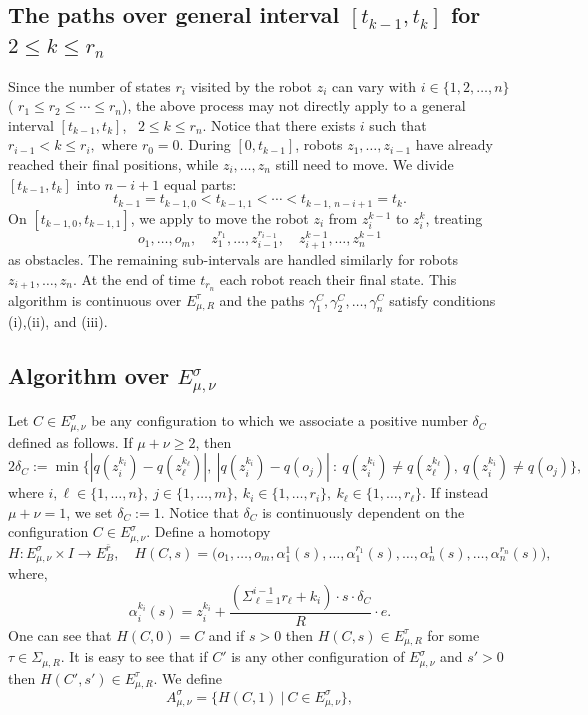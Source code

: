 \documentclass[12pt,oneside,reqno]{amsart}
\theoremstyle{plain}
\theoremstyle{definition}
\theoremstyle{remark}
\begin{document}
\medskip
\noindent
\subsection*{The paths over general interval \texorpdfstring{$[t_{k-1}, t_k]$ for $2 \leq k \leq r_n$}:}
Since the number of states $r_i$ visited by the robot $z_i$ can vary with $i \in \{1,2,\ldots,n\}$ ( $r_1 \leq r_2 \leq \cdots \leq r_n$), the above process may not directly apply to a general interval $[t_{k-1}, t_k]$,~ $2 \leq k \leq r_n$. Notice that there exists $i$ such that
$r_{i-1} < k \leq r_i, \text{ where } r_0 = 0.$
During $[0, t_{k-1}]$, robots $z_1, \ldots, z_{i-1}$ have already reached their final positions, while $z_i, \ldots, z_n$ still need to move.
We divide $[t_{k-1}, t_k]$ into $n - i + 1$ equal parts:
$$
t_{k-1} = t_{k-1,0} < t_{k-1,1} < \cdots < t_{k-1,\,n-i+1} = t_k.
$$
On $[t_{k-1,0}, t_{k-1,1}]$, we apply \cite[Section~2]{FarP23} to move the robot $z_i$ from $z_i^{k-1}$ to $z_i^k$, treating
\[
o_1, \ldots, o_m, \quad z_1^{r_1}, \ldots, z_{i-1}^{r_{i-1}}, \quad z_{i+1}^{k-1}, \ldots, z_n^{k-1}
\]
as obstacles. The remaining sub-intervals are handled similarly for robots $z_{i+1}, \ldots, z_n$.  At the end of time $t_{r_n}$ each robot reach their final state. 
This algorithm is continuous over $E_{\mu, R}^{\tau}$ and the paths $\gamma_1^C, \gamma_2^C, \ldots, \gamma_n^C$ satisfy conditions (i),(ii), and (iii).


\subsection{Algorithm over \texorpdfstring{$E_{\mu, \nu}^{\sigma}$}:} 

Let $C \in E_{\mu, \nu}^{\sigma}$ be any configuration to which we associate a positive number $\delta_C$ defined as follows. If $\mu + \nu \geq 2$, then  
$$2\delta_C:= \min \Big\{|q(z_i^{k_i})-q(z_\ell^{k_\ell})|, ~|q(z_i^{k_i})-q(o_j)|~\colon~q(z_i^{k_i})\neq q(z_\ell^{k_\ell}),~ q(z_i^{k_i})\neq q(o_j)\Big\},$$
where $i, \ell \in \{1, \ldots, n\}, ~ j\in \{1, \ldots, m\}, ~ k_i \in \{1, \ldots, r_i\}, ~ k_\ell \in \{1, \ldots, r_\ell\}$. If instead $\mu + \nu = 1$, we set $\delta_C := 1$. Notice that $\delta_C$ is continuously dependent on the configuration $C \in E_{\mu, \nu}^{\sigma}$.  Define a homotopy 
$$H:  E_{\mu, \nu}^{\sigma} \times I \to E^{\bar{r}}_B, \quad H(C, s)= \Big(o_1, \ldots, o_m, \alpha^1_{1}(s), \ldots , \alpha^{r_{1}}_{1}(s), \ldots, \alpha^1_{n}(s), \ldots , \alpha^{r_{n}}_{n}(s) \Big),$$
where, $$\alpha_i^{k_i}(s)= z_i^{k_i}+ \frac{(\Sigma_{\ell=1}^{i-1}r_\ell + k_i)\cdot s \cdot \delta_C}{R}\cdot e.$$   
One can see that $H(C, 0)=C$ and if $s>0$ then $H(C, s)\in E_{\mu, R}^{\tau}$ for some $\tau \in \Sigma_{\mu, R}$. It is easy to see that if $C'$ is any other configuration of $E_{\mu, \nu}^{\sigma}$ and $s'>0$ then $H(C', s')\in E_{\mu, R}^{\tau}.$ We define $$A_{\mu, \nu}^{\sigma}=\{ H(C, 1) ~|~ C\in E_{\mu, \nu}^{\sigma}\},$$
\end{document}
